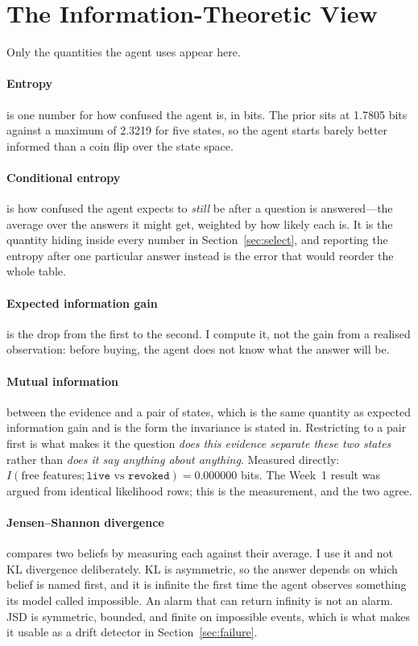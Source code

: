 \documentclass{article}
\begin{document}
\section{The Information-Theoretic View}
\label{sec:info}

Only the quantities the agent uses appear here.

\paragraph{Entropy} is one number for how confused the agent is, in bits. The
prior sits at 1.7805 bits against a maximum of 2.3219 for five states, so the
agent starts barely better informed than a coin flip over the state space.

\paragraph{Conditional entropy} is how confused the agent expects to \emph{still}
be after a question is answered---the average over the answers it might get,
weighted by how likely each is. It is the quantity hiding inside every number in
Section~\ref{sec:select}, and reporting the entropy after one particular answer
instead is the error that would reorder the whole table.

\paragraph{Expected information gain} is the drop from the first to the second. I
compute it, not the gain from a realised observation: before buying, the agent
does not know what the answer will be.

\paragraph{Mutual information} between the evidence and a pair of states, which is
the same quantity as expected information gain and is the form the invariance is
stated in. Restricting to a pair first is what makes it the question \emph{does
this evidence separate these two states} rather than \emph{does it say anything
about anything}. Measured directly: $I(\text{free features}; \texttt{live}
\text{ vs } \texttt{revoked}) = 0.000000$ bits. The Week~1 result was argued from
identical likelihood rows; this is the measurement, and the two agree.

\paragraph{Jensen--Shannon divergence} compares two beliefs by measuring each
against their average. I use it and not KL divergence deliberately. KL is
asymmetric, so the answer depends on which belief is named first, and it is
infinite the first time the agent observes something its model called impossible.
An alarm that can return infinity is not an alarm. JSD is symmetric, bounded, and
finite on impossible events, which is what makes it usable as a drift detector in
Section~\ref{sec:failure}.
\end{document}
